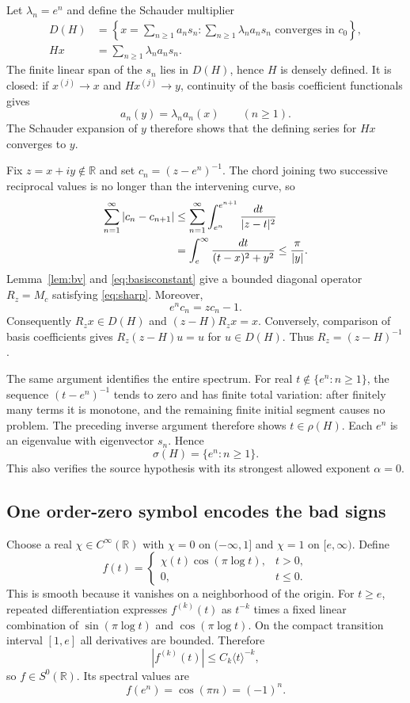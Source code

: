 \documentclass[11pt]{article}
\theoremstyle{remark}
\newcommand{\R}{\mathbb R}
\newcommand{\angles}[1]{\langle #1\rangle}
\begin{document}
Let $\lambda_n=e^n$ and define the Schauder multiplier
\begin{align*}
 D(H)&=\left\{x=\sum_{n\geq1}a_ns_n:
                 \sum_{n\geq1}\lambda_na_ns_n\text{ converges in }c_0\right\},\\
 Hx&=\sum_{n\geq1}\lambda_na_ns_n.
\end{align*}
The finite linear span of the $s_n$ lies in $D(H)$, hence $H$ is densely
defined.  It is closed: if $x^{(j)}\to x$ and $Hx^{(j)}\to y$, continuity of
the basis coefficient functionals gives
\[
 a_n(y)=\lambda_na_n(x) \qquad(n\geq1).
\]
The Schauder expansion of $y$ therefore shows that the defining series for
$Hx$ converges to $y$.

Fix $z=x+iy\notin\R$ and set $c_n=(z-e^n)^{-1}$.  The chord joining two
successive reciprocal values is no longer than the intervening curve, so
\begin{align}
 \sum_{n=1}^\infty|c_n-c_{n+1}|
 &\leq \sum_{n=1}^\infty
   \int_{e^n}^{e^{n+1}}\frac{dt}{|z-t|^2}\notag\\
 &=\int_e^\infty\frac{dt}{(t-x)^2+y^2}
 \leq \frac{\pi}{|y|}.\label{eq:variation}
\end{align}
Lemma~\ref{lem:bv} and \eqref{eq:basisconstant} give a bounded diagonal
operator $R_z=M_c$ satisfying \eqref{eq:sharp}.  Moreover,
\[
 e^nc_n=zc_n-1.
\]
Consequently $R_zx\in D(H)$ and $(z-H)R_zx=x$.  Conversely, comparison of
basis coefficients gives $R_z(z-H)u=u$ for $u\in D(H)$.  Thus
$R_z=(z-H)^{-1}$.

The same argument identifies the entire spectrum.  For real
$t\notin\{e^n:n\geq1\}$, the sequence $(t-e^n)^{-1}$ tends to zero and has
finite total variation: after finitely many terms it is monotone, and the
remaining finite initial segment causes no problem.  The preceding inverse
argument therefore shows $t\in\rho(H)$.  Each $e^n$ is an eigenvalue with
eigenvector $s_n$.  Hence
\[
 \sigma(H)=\{e^n:n\geq1\}.
\]
This also verifies the source hypothesis with its strongest allowed exponent
$\alpha=0$.

\subsection{One order-zero symbol encodes the bad signs}

Choose a real $\chi\in C^\infty(\R)$ with $\chi=0$ on $(-\infty,1]$ and
$\chi=1$ on $[e,\infty)$.  Define
\begin{equation}\label{eq:f}
 f(t)=
 \begin{cases}
   \chi(t)\cos(\pi\log t),&t>0,\\
   0,&t\leq0.
 \end{cases}
\end{equation}
This is smooth because it vanishes on a neighborhood of the origin.  For
$t\geq e$, repeated differentiation expresses $f^{(k)}(t)$ as
$t^{-k}$ times a fixed linear combination of
$\sin(\pi\log t)$ and $\cos(\pi\log t)$.  On the compact transition interval
$[1,e]$ all derivatives are bounded.  Therefore
\[
 |f^{(k)}(t)|\leq C_k\angles t^{-k},
\]
so $f\in S^0(\R)$.  Its spectral values are
\begin{equation}\label{eq:signvalues}
 f(e^n)=\cos(\pi n)=(-1)^n.
\end{equation}
\end{document}
